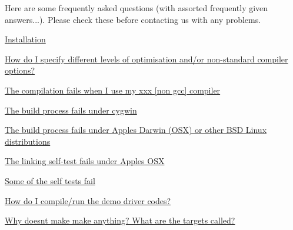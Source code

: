 Here are some frequently asked questions (with assorted frequently given answers...). Please check these before contacting us with any problems.


\begin{DoxyItemize}
\item \hyperlink{index_installation}{Installation} ~\newline
~\newline

\begin{DoxyItemize}
\item \hyperlink{index_comp_opt}{How do I specify different levels of optimisation and/or non-\/standard compiler options?} ~\newline
~\newline

\item \hyperlink{index_other_compilers}{The compilation fails when I use my xxx \mbox{[}non gcc\mbox{]} compiler} ~\newline
~\newline

\item \hyperlink{index_cygwin}{The build process fails under cygwin} ~\newline
~\newline

\item \hyperlink{index_apple}{The build process fails under Apple\textquotesingle{}s Darwin (O\+SX) or other B\+SD Linux distributions} ~\newline
~\newline

\item \hyperlink{index_apple_link}{The linking self-\/test fails under Apple\textquotesingle{}s O\+SX} ~\newline
~\newline

\item \hyperlink{index_self_tests}{Some of the self tests fail} ~\newline
~\newline

\item \hyperlink{index_run1}{How do I compile/run the demo driver codes?} ~\newline
~\newline

\item \hyperlink{index_run2}{Why doesn\textquotesingle{}t make make anything? What are the targets called?} ~\newline
~\newline


\end{DoxyItemize}
\end{DoxyItemize}
